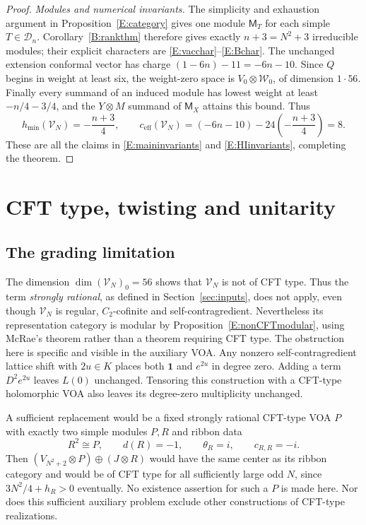 \documentclass[11pt]{article}
\newcommand{\one}{\mathbf1}\newcommand{\D}{\mathcal D}\newcommand{\Dcat}{\mathcal D}
\numberwithin{equation}{section}
\begin{document}
\begin{proof}
\emph{Modules and numerical invariants.} The simplicity and exhaustion argument in Proposition~\ref{E:category} gives one module $\mathsf M_T$ for each simple $T\in\D_n$. Corollary~\ref{B:rankthm} therefore gives exactly $n+3=N^2+3$ irreducible modules; their explicit characters are \eqref{E:vacchar}--\eqref{E:Bchar}. The unchanged extension conformal vector has charge $(1-6n)-11=-6n-10$. Since $Q$ begins in weight at least six, the weight-zero space is $V_0\otimes\mathcal W_0$, of dimension $1\cdot56$. Finally every summand of an induced module has lowest weight at least $-n/4-3/4$, and the $Y\otimes M$ summand of $\mathsf M_X$ attains this bound. Thus
\[
h_{\min}(\mathscr{V}_N)=-\frac{n+3}{4},\qquad
c_{\mathrm{eff}}(\mathscr{V}_N)=(-6n-10)-24\left(-\frac{n+3}{4}\right)=8.
\]
These are all the claims in \eqref{E:maininvariants} and \eqref{E:HIinvariants}, completing the theorem.
\end{proof}

\section{CFT type, twisting and unitarity}\label{E:scope}
\subsection{The grading limitation}
The dimension $\dim(\mathscr{V}_N)_0=56$ shows that $\mathscr{V}_N$ is not of CFT type. Thus the term \emph{strongly rational}, as defined in Section~\ref{sec:inputs}, does not apply, even though $\mathscr{V}_N$ is regular, $C_2$-cofinite and self-contragredient. Nevertheless its representation category is modular by Proposition~\ref{E:nonCFTmodular}, using McRae's theorem rather than a theorem requiring CFT type. The obstruction here is specific and visible in the auxiliary VOA. Any nonzero self-contragredient lattice shift with $2u\in K$ places both $\one$ and $e^{2u}$ in degree zero. Adding a term $D^2e^{2u}$ leaves $L(0)$ unchanged. Tensoring this construction with a CFT-type holomorphic VOA also leaves its degree-zero multiplicity unchanged.

A sufficient replacement would be a fixed strongly rational CFT-type VOA $P$ with exactly two simple modules $P,R$ and ribbon data
\begin{equation}\label{E:CFTproblem}
R^2\cong P,\qquad d(R)=-1,\qquad\theta_R=i,\qquad c_{R,R}=-i.
\end{equation}
Then $(V_{N^2+2}\otimes P)\oplus(J\otimes R)$ would have the same center as its ribbon category and would be of CFT type for all sufficiently large odd $N$, since $3N^2/4+h_R>0$ eventually. No existence assertion for such a $P$ is made here. Nor does this sufficient auxiliary problem exclude other constructions of CFT-type realizations.
\end{document}
